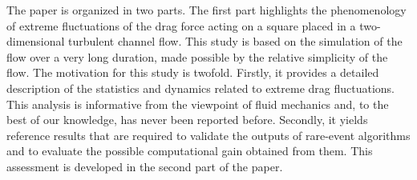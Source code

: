 \documentclass{jfm}
\newcommand{\EL}[1]{{\color{myred}{#1}}}
\begin{document}
%
%
%
%


The paper is organized in two parts. The first part highlights the phenomenology of extreme fluctuations of the drag force acting on a square placed in a two-dimensional turbulent channel flow. This study is based on the simulation of the flow over a very long duration, made possible by the relative simplicity of the flow.
%
The motivation for this study is twofold.
Firstly, it provides a detailed description of the statistics and dynamics related to extreme drag fluctuations. This analysis is informative from the  viewpoint of fluid mechanics and, to the best of our knowledge, has never been reported before.
Secondly, it yields reference results that are required to validate the outputs of rare-event algorithms and to evaluate the possible computational gain obtained from them. This assessment is developed in the second part of the paper.
\end{document}
